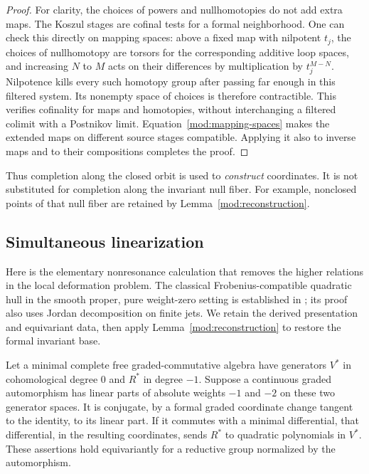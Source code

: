 \begin{proof}
For clarity, the choices of powers and nullhomotopies do not add
extra maps. The Koszul stages are cofinal tests for a formal
neighborhood. One can check this directly on mapping spaces: above
a fixed map with nilpotent $t_j$, the choices of nullhomotopy are
torsors for the corresponding additive loop spaces, and increasing
$N$ to $M$ acts on their differences by multiplication by
$t_j^{M-N}$. Nilpotence kills every such homotopy group after passing
far enough in this filtered system. Its nonempty space of choices
is therefore contractible. This verifies cofinality for maps and
homotopies, without interchanging a filtered colimit with a
Postnikov limit. Equation~\eqref{mod:mapping-spaces} makes the
extended maps on different source stages compatible. Applying it
also to inverse maps and to their compositions completes the proof.
\end{proof}

Thus completion along the closed orbit is used to \emph{construct}
coordinates. It is not substituted for completion along the invariant
null fiber. For example, nonclosed points of that null fiber are
retained by Lemma~\ref{mod:reconstruction}.

\subsection{Simultaneous linearization}

Here is the elementary nonresonance calculation that removes the
higher relations in the local deformation problem.
The classical Frobenius-compatible quadratic hull in the smooth proper,
pure weight-zero setting is established in
\cite[Theorem~2.11 and Corollary~2.12]{Pridham}; its proof also uses
Jordan decomposition on finite jets. We retain the derived presentation
and equivariant data, then apply Lemma~\ref{mod:reconstruction} to
restore the formal invariant base.

\begin{lemma}
\label{mod:nonresonance}
Let a minimal complete free graded-commutative algebra have generators
$V^*$ in cohomological degree $0$ and $R^*$ in degree $-1$. Suppose a
continuous graded automorphism has linear parts of absolute weights
$-1$ and $-2$ on these two generator spaces. It is conjugate, by a
formal graded coordinate change tangent to the identity, to its
linear part. If it commutes with a minimal differential, that
differential, in the resulting coordinates, sends $R^*$ to quadratic
polynomials in $V^*$. These assertions hold equivariantly for a
reductive group normalized by the automorphism.
\end{lemma}

